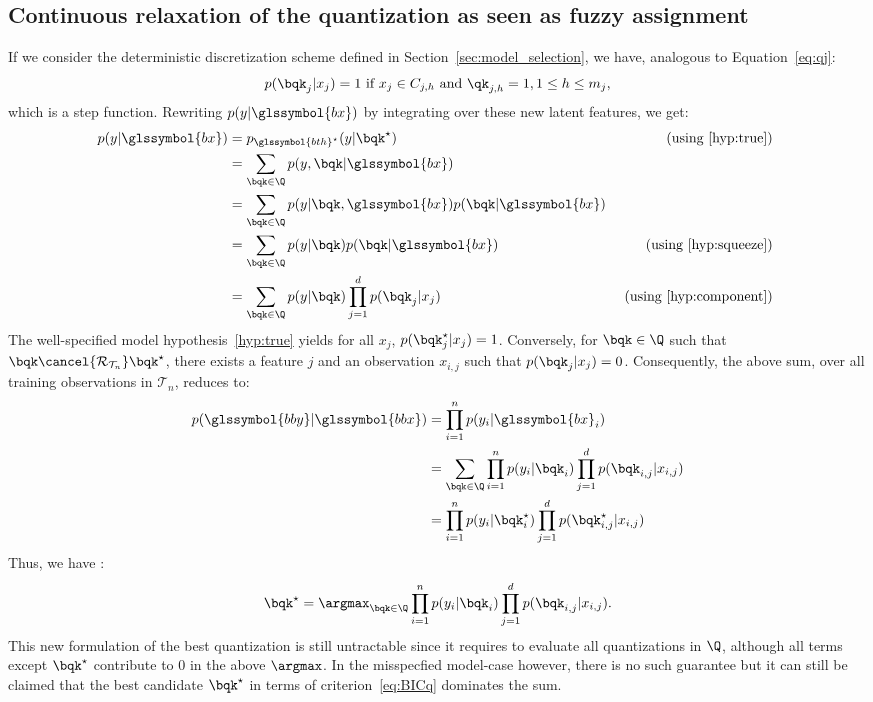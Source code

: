 \subsection{Continuous relaxation of the quantization as seen as fuzzy assignment} \label{subsec:fuzzy}

If we consider the deterministic discretization scheme defined in Section~\ref{sec:model_selection}, we have, analogous to Equation~\eqref{eq:qj}:
$$
p(\bqk_j | x_j) = 1 \text{ if } x_j \in C_{j,h} \text{ and } \qk_{j,h} = 1, 1 \leq h \leq m_j,
$$
which is a step function. Rewriting $p(y| \glssymbol{bx})$ by integrating over these new latent features,
we get:
\begin{align*}
p(y | \glssymbol{bx}) & = p_{\glssymbol{bth}^\star}(y | \bqk^\star) & \text{ (using \eqref{hyp:true}) } \\
& = \sum_{\bqk \in \Q} p(y, \bqk | \glssymbol{bx}) \\
& = \sum_{\bqk \in \Q} p(y | \bqk, \glssymbol{bx}) p(\bqk | \glssymbol{bx}) \\
& = \sum_{\bqk \in \Q} p(y | \bqk) p(\bqk | \glssymbol{bx}) & \text{ (using \eqref{hyp:squeeze}) } \\
& = \sum_{\bqk \in \Q} p(y | \bqk) \prod_{j=1}^d p(\bqk_j | x_j) & \text{ (using \eqref{hyp:component}) }
\end{align*}
The well-specified model hypothesis~\eqref{hyp:true} yields for all $x_j$, $p(\bqk_j^\star | x_j) = 1$. Conversely, for $\bqk \in \Q$ such that $\bqk \cancel{\mathcal{R}_{\mathcal{T}_n}} \bqk^\star$, there exists a feature $j$ and an observation $x_{i,j}$ such that $p(\bqk_j | x_j) = 0$. Consequently, the above sum, over all training observations in $\mathcal{T}_n$, reduces to:
\begin{align*}
p(\glssymbol{bby} | \glssymbol{bbx}) & = \prod_{i=1}^n p(y_i | \glssymbol{bx}_i) \\
 & = \sum_{\bqk \in \Q} \prod_{i=1}^n p(y_i | \bqk_i) \prod_{j=1}^d p(\bqk_{i,j} | x_{i,j}) \\
 & = \prod_{i=1}^n p(y_i | \bqk_i^\star) \prod_{j=1}^d p(\bqk_{i,j}^\star | x_{i,j})
\end{align*}
Thus, we have :
\[ \bqk^\star = \argmax_{\bqk \in \Q} \prod_{i=1}^n p(y_i | \bqk_i ) \prod_{j=1}^d p(\bqk_{i,j} | x_{i,j}). \]
This new formulation of the best quantization is still untractable since it requires to evaluate all quantizations in $\Q$, although all terms except $\bqk^\star$ contribute to $0$ in the above $\argmax$. In the misspecfied model-case however, there is no such guarantee but it can still be claimed that the best candidate $\bqk^\star$ in terms of criterion~\eqref{eq:BICq} dominates the sum.

